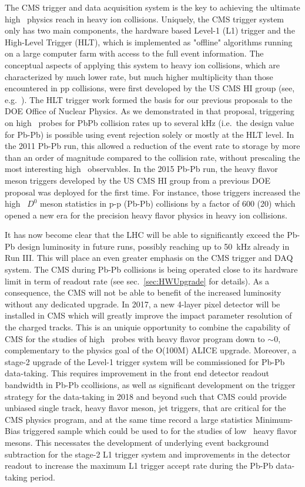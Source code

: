 The CMS trigger and data acquisition system is the key to achieving the ultimate high \pt\ physics reach in heavy ion collisions. Uniquely, the CMS trigger system only has two main components, the hardware based Level-1 (L1) trigger and the High-Level Trigger (HLT), which is implemented as "offline" algorithms running on a large computer farm with access to the full event information.  
The conceptual aspects of applying this system to heavy ion collisions, which are characterized by much lower rate, but much higher multiplicity than those encountered in pp collisions, were first developed by the US CMS HI group (see, e.g.\ \cite{Roland:2007is}). The HLT trigger work formed the basis for our previous proposals to the DOE Office of Nuclear Physics. As we demonstrated in that proposal, triggering on high \pt\ probes for PbPb collision rates up to several kHz (i.e.\ the design value for Pb-Pb) is possible using event rejection solely or mostly at the HLT level. In the 2011 Pb-Pb run, this allowed a reduction of the event rate to storage by more than an order of magnitude compared to the collision rate, without prescaling the most interesting high \pt\ observables. In the 2015 Pb-Pb run, the heavy flavor meson triggers developed by the US CMS HI group from a previous DOE proposal was deployed for the first time. For instance, those triggers increased the high \pt\ $D^0$ meson statistics in p-p (Pb-Pb) collisions by a factor of 600 (20) which opened a new era for the precision heavy flavor physics in heavy ion collisions.

It has now become clear that the LHC will be able to significantly exceed the Pb-Pb design luminosity in future runs, possibly reaching up to 50~kHz already in Run III. This will place an even greater emphasis on the CMS trigger and DAQ system. The CMS during Pb-Pb collisions is being operated close to its hardware limit in term of readout rate (see sec.~\ref{sec:HWUpgrade} for details). As a consequence, the CMS will not be able to benefit of the increased luminosity without any dedicated upgrade. 
In 2017, a new 4-layer pixel detector will be installed in CMS which will greatly improve the impact parameter resolution of the charged tracks. This is an uniquie opportunity to combine the capability of CMS for the studies of high \pt\ probes with heavy flavor program down to \pt$\sim 0$, complementary to the physics goal of the O(100M) ALICE upgrade. Moreover, a stage-2 upgrade of the Level-1 trigger system will be commissioned for Pb-Pb data-taking. This requires improvement in the front end detector readout bandwidth in Pb-Pb ccollisions, as well as significant development on the trigger strategy for the data-taking in 2018 and beyond such that CMS could provide unbiased single track, heavy flavor meson, jet triggers, that are critical for the CMS physics program, and at the same time record a large statistics Minimum-Bias triggered sample which could be used to for the studies of low \pt\ heavy flavor mesons. This necessates the development of underlying event background subtraction for the stage-2 L1 trigger system and improvements in the detector readout to increase the maximum L1 trigger accept rate during the Pb-Pb data-taking period.

